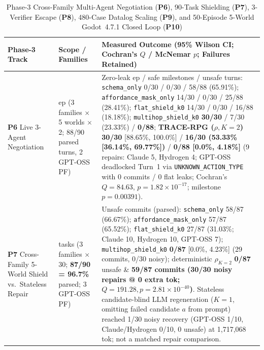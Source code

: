 \begin{table}[!tbp]
\caption{Phase-3 Cross-Family Multi-Agent Negotiation (\textbf{P6}), 90-Task Shielding (\textbf{P7}), 3-Verifier Escape (\textbf{P8}), 480-Case Datalog Scaling (\textbf{P9}), and 50-Episode 5-World Godot~4.7.1 Closed Loop (\textbf{P10})}
\label{tab:phase3-supplements}
\centering
\scriptsize
\setlength{\tabcolsep}{3.5pt}
\begin{tabularx}{\textwidth}{@{}>{\raggedright\arraybackslash}p{}>{\raggedright\arraybackslash}p{}>{\raggedright\arraybackslash}X@{}}
\toprule
\textbf{Phase-3 Track} & \textbf{Scope / Families} & \textbf{Measured Outcome (95\% Wilson CI; Cochran's $Q$ / McNemar $p$; Failures Retained)} \\
\midrule
\textbf{P6} Live 3-Agent Negotiation & 30 ep (3 families $\times$ 5 worlds $\times$ 2; 88/90 parsed turns, 2 GPT-OSS PF) & Zero-leak ep / safe milestones / unsafe turns: \texttt{schema\_only} 0/30 / 0/30 / 58/88 (65.91\%); \texttt{affordance\_}\allowbreak\texttt{mask\_only} 14/30 / 0/30 / 25/88 (28.41\%); \texttt{flat\_}\allowbreak\texttt{shield\_k0} 14/30 / 0/30 / 16/88 (18.18\%); \texttt{multihop\_}\allowbreak\texttt{shield\_k0} \textbf{30/30} / 7/30 (23.33\%) / \textbf{0/88}; \textbf{TRACE-RPG ($\rho, K{=}2$)} \textbf{30/30} [88.65\%, 100.0\%] / \textbf{16/30 (53.33\% [36.14\%, 69.77\%])} / \textbf{0/88 [0.0\%, 4.18\%]} (9 repairs: Claude 5, Hydrogen 4; GPT-OSS deadlocked Turn~1 via \texttt{UNKNOWN\_ACTION\_TYPE} with 0 commits / 0 flat leaks; Cochran's $Q{=}84.63$, $p{=}1.82{\times}10^{-17}$; milestone $p{=}0.00391$). \\
\textbf{P7} Cross-Family 5-World Shield vs.\ Stateless Repair & 90 tasks (3 families $\times$ 30; \textbf{87/90 = 96.7\%} parsed; 3 GPT-OSS PF) & Unsafe commits (parsed): \texttt{schema\_only} 58/87 (66.67\%); \texttt{affordance\_}\allowbreak\texttt{mask\_only} 57/87 (65.52\%); \texttt{flat\_}\allowbreak\texttt{shield\_k0} 27/87 (31.03\%; Claude 10, Hydrogen 10, GPT-OSS 7); \texttt{multihop\_}\allowbreak\texttt{shield\_k0} \textbf{0/87} [0.0\%, 4.23\%] (29 commits, 0/30 noisy); deterministic $\rho_{K=2}$ \textbf{0/87} unsafe \& \textbf{59/87 commits (30/30 noisy repairs @ 0 extra tok; $Q{=}191.28, p{=}2.81{\times}10^{-40}$)}. Stateless candidate-blind LLM regeneration ($K{=}1$, omitting failed candidate $a$ from prompt) reached 1/30 noisy recovery (GPT-OSS 1/10, Claude/Hydrogen 0/10, 0 unsafe) at 1,717,068 tok; not a matched repair comparison. \\

\end{tabularx}
\end{table}
